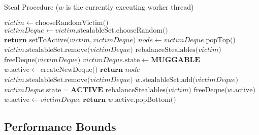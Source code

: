 \documentclass[bsc,frontabs,singlespacing,parskip,deptreport,normalheadings]{infthesis}
\begin{document}
\begin{algorithm}
\caption{Steal Procedure ($w$ is the currently executing worker thread)}\label{alg:steal}
\begin{algorithmic}[1]
            \State $victim \gets \text{chooseRandomVictim()} $
                \label{line:choose_random_victim}
            \State $ victimDeque \gets victim \text{.stealableSet.chooseRandom()} $
                \label{line:choose_random}
                \State $ \textbf{return } \text{setToActive(} victim, victimDeque \text{)}$ 
            \EndIf
            \State $ node \gets victimDeque \text{.popTop()} $
                \State $ victim \text{.stealableSet.remove(} victimDeque \text{)} $
                \State $ \text{rebalanceStealables(} victim \text{)} $
                    \label{line:rebalance_1}
                    \State $ \text{freeDeque(} victimDeque \text{)} $
                \EndIf
                \State $victimDeque\text{.state} \gets \textbf{MUGGABLE}$
            \EndIf
                    \State $w \text{.active} \gets \text{createNewDeque()}$
                \EndIf
                \State $ \textbf{return } node $
            \EndIf
        \EndWhile
    \EndFunction
        \State $ victim \text{.stealableSet.remove(} victimDeque \text{)} $
        \State $ w \text{.stealableSet.add(} victimDeque \text{)} $
        \State $ victimDeque \text{.state} = \textbf{ACTIVE} $
        \State $ \text{rebalanceStealables(} victim \text{)} $
            \label{line:rebalance_2}
            \State $ \text{freeDeque(} w \text{.active)} $
        \EndIf
        \State $ w \text{.active} \gets victimDeque $
        \State $ \textbf{return } w \text{.active.popBottom()} $
    \EndFunction
\end{algorithmic}
\end{algorithm}

\subsection{Performance Bounds}
\label{subsection:performance_bounds}
\end{document}
